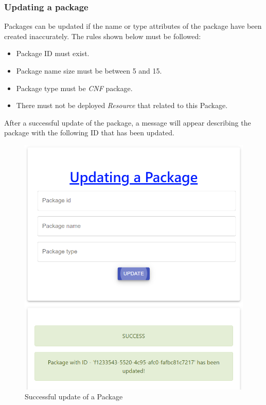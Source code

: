 \subsubsection{Updating a package}
Packages can be updated if the name or type attributes of the package have been created inaccurately. The rules shown below must be followed:
\begin{itemize}
  \item Package ID must exist.
  \item Package name size must be between 5 and 15.
  \item Package type must be \emph{CNF} package.
  \item There must not be deployed \emph{Resource} that related to this Package.
\end{itemize}

After a successful update of the package, a message will appear describing the package with the following ID that has been updated.
\begin{figure}[H]
	\centering
	\includegraphics[width=138mm]{images/update-package-2.png}
	\caption{Successful update of a Package}
\end{figure}

